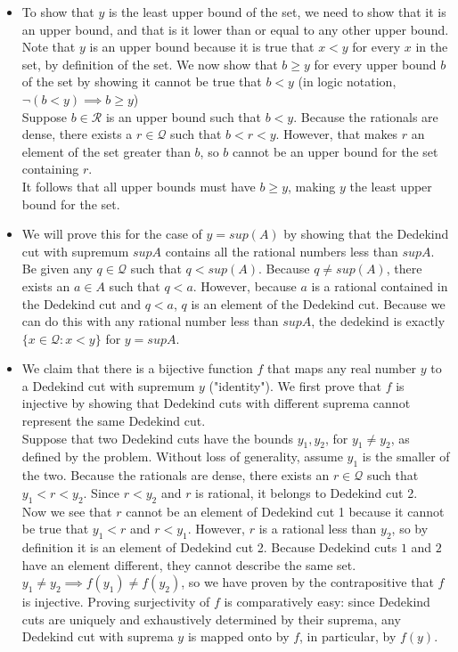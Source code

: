\documentclass[11 pt]{article}
\begin{document}
\begin{solution}
\begin{itemize}
	\item To show that $y$ is the least upper bound of the set, we need to show that it is an upper bound, and that is it lower than or equal to any other upper bound.\\
	Note that $y$ is an upper bound because it is true that $x<y$ for every $x$ in the set, by definition of the set.
	We now show that $b\geq y$ for every upper bound $b$ of the set by showing it cannot be true that $b<y$ (in logic notation, $\neg(b<y)\implies b\geq y$) \\
	Suppose $b\in\mathcal{R}$ is an upper bound such that $b<y$. Because the rationals are dense, there exists a $r\in\mathcal{Q}$ such that $b<r<y$. However, that makes $r$ an element of the set greater than $b$, so $b$ cannot be an upper bound for the set containing $r$.\\
	It follows that all upper bounds must have $b\geq y$, making $y$ the least upper bound for the set.

\item We will prove this for the case of $y=sup(A)$ by showing that the Dedekind cut with supremum $supA$ contains all the rational numbers less than $supA$.
	Be given any $q\in\mathcal{Q}$ such that $q<sup(A)$. Because $q\neq sup(A)$, there exists an $a\in A$ such that $q<a$. However, because  $a$ is a rational contained in the Dedekind cut and $q<a$, $q$ is an element of the Dedekind cut.
	Because we can do this with any rational number less than $supA$, the dedekind is exactly $\{x\in\mathcal{Q}:x<y\}$ for $y=supA$.

\item We claim that there is a bijective function $f$ that maps any real number $y$ to a Dedekind cut with supremum $y$ ("identity"). We first prove that $f$ is injective by showing that Dedekind cuts with different suprema cannot represent the same Dedekind cut.\\
	Suppose that two Dedekind cuts have the bounds $y_1, y_2$, for $y_1\neq y_2$, as defined by the problem. Without loss of generality, assume $y_1$ is the smaller of the two. Because the rationals are dense, there exists an  $r\in\mathcal{Q}$ such that $y_1<r<y_2$. Since $r <y_2$ and $r$ is rational, it belongs to Dedekind cut 2.\\
	Now we see that $r$ cannot be an element of Dedekind cut 1 because it cannot be true that $y_1<r$ and $r<y_1$. However, $r$ is a rational less than $y_2$, so by definition it is an element of Dedekind cut 2. Because Dedekind cuts $1$ and $2$ have an element different, they cannot describe the same set. $y_1\neq y_2 \implies f(y_1)\neq f(y_2)$, so we have proven by the contrapositive that $f$ is injective.
	Proving surjectivity of $f$ is comparatively easy: since Dedekind cuts are uniquely and exhaustively determined by their suprema, any Dedekind cut with suprema $y$ is mapped onto by $f$, in particular, by $f(y)$.
\end{itemize}
\end{solution}
\end{document}
